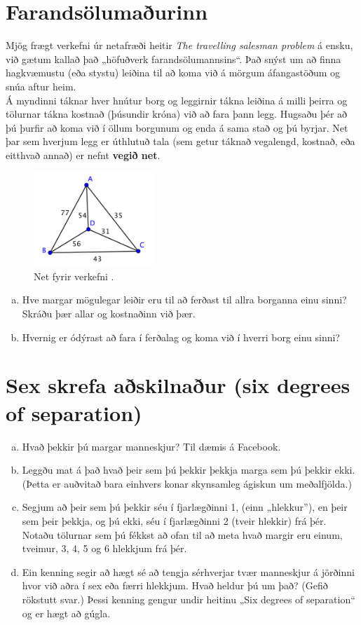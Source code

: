 \documentclass[b5paper,12pt]{book}
\renewcommand*\thesection{\arabic{section}}
\begin{document}
\section{Farandsölumaðurinn}
\label{sec:travelling}
Mjög frægt verkefni úr netafræði heitir \textit{The travelling salesman problem} á ensku, við gætum kallað það „höfuðverk farandsölumannsins“. Það snýst um að finna hagkvæmustu (eða stystu) leiðina til að koma við á mörgum áfangastöðum og snúa aftur heim. \\
Á myndinni táknar hver hnútur borg og leggirnir tákna leiðina á milli þeirra og tölurnar tákna kostnað (þúsundir króna) við að fara þann legg. Hugsaðu þér að þú þurfir að koma við í öllum borgunum og enda á sama stað og þú byrjar. Net þar sem hverjum legg er úthlutuð tala (sem getur táknað vegalengd, kostnað, eða eitthvað annað) er nefnt \textbf{vegið net}.

\begin{figure}[h]
  \includegraphics[width=0.4\textwidth, center]{tsp1.png}
  \caption*{Net fyrir verkefni \thesection{}.}
\end{figure}

\begin{enumerate}[(a)]
    \item Hve margar mögulegar leiðir eru til að ferðast til allra borganna einu sinni? Skráðu þær allar og kostnaðinn við þær. 
    \item Hvernig er ódýrast að fara í ferðalag og koma við í hverri borg einu sinni? 
\end{enumerate}

\section{Sex skrefa aðskilnaður (six degrees of separation)}
\label{sec:sixdegrees}
\begin{enumerate}[(a)]
\item Hvað þekkir þú margar manneskjur? Til dæmis á Facebook.
\item Leggðu mat á það hvað þeir sem þú þekkir þekkja marga sem þú þekkir ekki. (Þetta er auðvitað bara einhvers konar skynsamleg ágiskun um meðalfjölda.)
\item Segjum að þeir sem þú þekkir séu í fjarlægðinni 1, (einn „hlekkur”), en þeir sem þeir þekkja, og þú ekki, séu í fjarlægðinni 2 (tveir hlekkir) frá þér. Notaðu tölurnar sem þú fékkst að ofan til að meta hvað margir eru einum, tveimur, 3, 4, 5 og 6 hlekkjum frá þér.
\item Ein kenning segir að hægt sé að tengja sérhverjar tvær manneskjur á jörðinni hvor við aðra í sex eða færri hlekkjum. Hvað heldur þú um það? (Gefið rökstutt svar.) Þessi kenning gengur undir heitinu „Six degrees of separation“ og er hægt að gúgla.
\end{enumerate}
\end{document}
